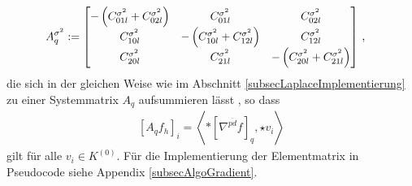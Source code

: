     \begin{align}
      A^{\sigma^{2}}_{q} &:=
      \begin{bmatrix}
        -\left( C^{\sigma^{2}}_{01l} + C^{\sigma^{2}}_{02l}\right) & C^{\sigma^{2}}_{01l} & C^{\sigma^{2}}_{02l} \\
        C^{\sigma^{2}}_{10l} & -\left( C^{\sigma^{2}}_{10l} + C^{\sigma^{2}}_{12l}\right) & C^{\sigma^{2}}_{12l} \\
        C^{\sigma^{2}}_{20l} & C^{\sigma^{2}}_{21l} & -\left( C^{\sigma^{2}}_{20l} + C^{\sigma^{2}}_{21l}\right)
      \end{bmatrix} \,\text{,}
    \end{align}
    die sich in der gleichen Weise wie im Abschnitt \ref{subsecLaplaceImplementierung} zu einer Systemmatrix \( A_{q} \) aufsummieren lässt
    , so dass
    \begin{align}
      \left[A_{q}f_{h} \right]_{i} =  \left\langle *\left[ \nabla^{\overline{pd}} f \right]_{q}, \star v_{i} \right\rangle
    \end{align}
    gilt für alle \( v_{i}\in K^{(0)} \).
    Für die Implementierung der Elementmatrix in Pseudocode siehe Appendix \ref{subsecAlgoGradient}.

